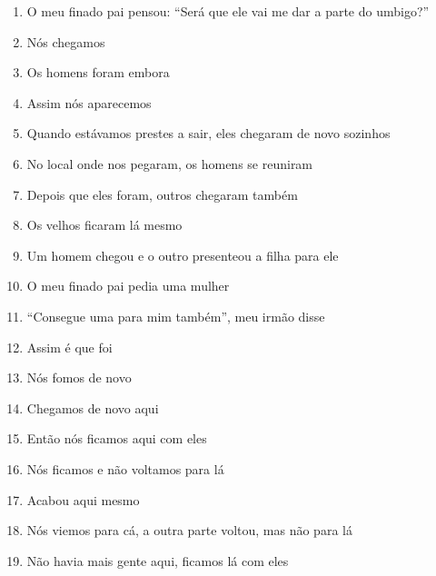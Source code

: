 \begin{enumerate}
 \item O meu finado pai pensou: ``Será que ele vai me dar a parte do umbigo?''

 \item Nós chegamos

 \item Os homens foram embora

 \begin{center}\end{center}

 \item Assim nós aparecemos

 \item Quando estávamos prestes a sair, eles chegaram de novo sozinhos

 \item No local onde nos pegaram, os homens se reuniram

 \item Depois que eles foram, outros chegaram também

 \item Os velhos ficaram lá mesmo

 \item Um homem chegou e o outro presenteou a filha para ele

 \item O meu finado pai pedia uma mulher

 \item ``Consegue uma para mim também'', meu irmão disse

 \item Assim é que foi

 \item Nós fomos de novo

 \item Chegamos de novo aqui

 \item Então nós ficamos aqui com eles

 \item Nós ficamos e não voltamos para lá

 \item Acabou aqui mesmo

 \begin{center}\end{center}

 \item Nós viemos para cá, a outra parte voltou, mas não para lá

 \item Não havia mais gente aqui, ficamos lá com eles


\end{enumerate}
